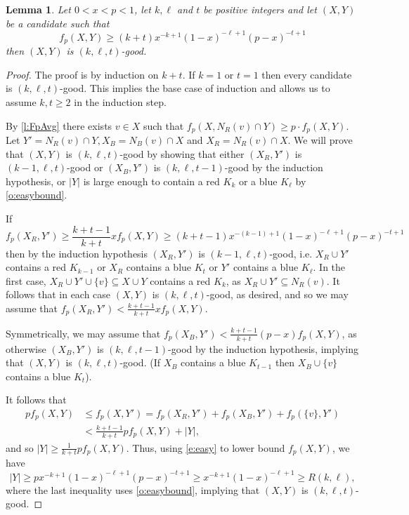\documentclass[reqno,final,12pt]{amsart}
\newtheorem{lem}[thm]{Lemma}
\begin{document}
\begin{lem}\label{l:easy}
	Let $0<x<p<1$, let $k,\ell$ and $t$ be positive integers and let   $(X,Y)$ be a candidate such that 
	\begin{equation}\label{e:easy}
	f_{p}(X,Y) \geq  (k+t)x^{-k+1}(1-x)^{-\ell+1}(p-x)^{-t+1}
	\end{equation}	
	then $(X,Y)$ is $(k,\ell,t)$-good.
\end{lem}
\begin{proof}
	The proof is by induction on $k+t$. If $k=1$ or $t=1$ then  every candidate is $(k,\ell,t)$-good. This implies the base case of induction and allows us to assume $k,t \geq 2$ in the induction step. 
	
	By \cref{l:FpAvg} there exists $v \in X$ such that  $f_p(X,N_R(v) \cap Y) \geq p \cdot f_p(X,Y)$. Let $Y' = N_R(v) \cap Y, X_B=  N_B(v) \cap X$ and $X_R=  N_R(v) \cap X$. We will prove that $(X,Y)$ is $(k,\ell,t)$-good by showing that either $(X_R,Y')$ is $(k-1,\ell,t)$-good or 
	$(X_B,Y')$ is $(k,\ell,t-1)$-good by the induction hypothesis, or $|Y|$ is large enough to contain a red $K_k$ or a blue $K_{\ell}$ by \cref{o:easybound}.
	
	If $$f_p(X_R,Y') \geq \frac{k+t-1}{k+t} x f_p(X,Y) \geq (k+t-1)x^{-(k-1)+1}(1-x)^{-\ell+1}(p-x)^{-t+1 }$$ then by the induction hypothesis $(X_R,Y')$ is  $(k-1,\ell,t)$-good, i.e. $X_R \cup Y'$ contains a red $K_{k-1}$ or $X_R$ contains a blue $K_t$ or $Y'$ contains a blue $K_\ell$. In the first case,  $X_R \cup Y' \cup \{v\} \subseteq X \cup Y$ contains a red $K_k$, as $X_R \cup Y' \subseteq N_R(v).$ It follows that in each case  $(X,Y)$ is  $(k,\ell,t)$-good, as desired, and so we may assume that $f_p(X_R,Y') < \frac{k+t-1}{k+t} x f_p(X,Y)$.
	
Symmetrically, we may assume that $f_p(X_B,Y') <\frac{k+t-1}{k+t}(p-x) f_p(X,Y)$, as otherwise $(X_B,Y')$ is  $(k,\ell,t-1)$-good by the induction hypothesis, implying that  $(X,Y)$ is  $(k,\ell,t)$-good. (If $X_B$ contains a blue $K_{t-1}$ then $X_B \cup \{v\}$ contains a blue $K_t$).

It follows that
\begin{align*}
 	 p  f_p(X,Y) &\leq f_p(X,Y') = f_p(X_R,Y') + f_p(X_B,Y') + f_p(\{v\},Y') \\ &< \frac{k+t-1}{k+t}pf_p(X,Y) + |Y|,
	\end{align*}
and so $|Y| \geq \frac{1}{{k+t}}pf_p(X,Y)$.
Thus, using \eqref{e:easy} to lower bound $f_p(X,Y)$, we have
$$
|Y| \geq  px^{-k+1}(1-x)^{-\ell+1}(p-x)^{-t+1} \geq x^{-k+1}(1-x)^{-\ell+1} \geq  R(k,\ell),
$$	
where the last inequality uses \cref{o:easybound}, implying that $(X,Y)$ is  $(k,\ell,t)$-good. 
\end{proof}	
\end{document}
